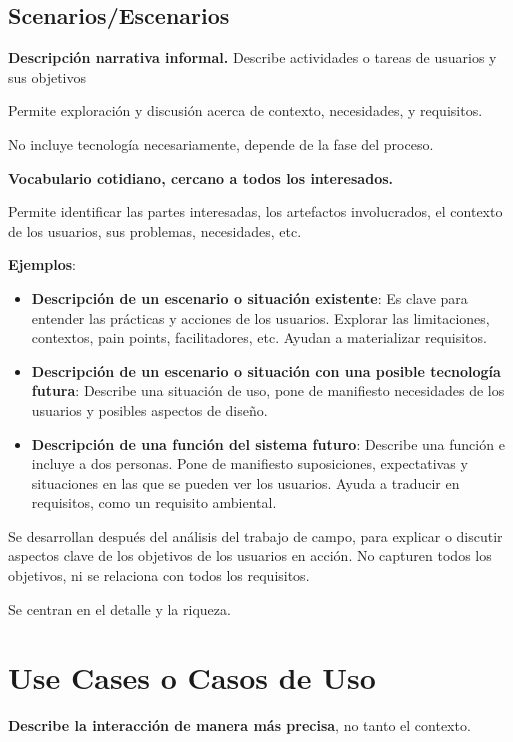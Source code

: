\documentclass[12pt]{report} %
\begin{document}
\subsection{Scenarios/Escenarios}

\textbf{Descripción narrativa informal.} Describe actividades o tareas
de usuarios y sus objetivos

Permite exploración y discusión acerca de contexto, necesidades, y
requisitos.

No incluye tecnología necesariamente, depende de la fase del proceso.

\textbf{Vocabulario cotidiano, cercano a todos los interesados.}

Permite identificar las partes interesadas, los artefactos involucrados,
el contexto de los usuarios, sus problemas, necesidades, etc.

\textbf{Ejemplos}:

\begin{itemize}

\item
  \textbf{Descripción de un escenario o situación existente}: Es clave
  para entender las prácticas y acciones de los usuarios. Explorar las
  limitaciones, contextos, pain points, facilitadores, etc. Ayudan a
  materializar requisitos.
\item
  \textbf{Descripción de un escenario o situación con una posible
  tecnología futura}: Describe una situación de uso, pone de manifiesto
  necesidades de los usuarios y posibles aspectos de diseño.
\item
  \textbf{Descripción de una función del sistema futuro}: Describe una
  función e incluye a dos personas. Pone de manifiesto suposiciones,
  expectativas y situaciones en las que se pueden ver los usuarios.
  Ayuda a traducir en requisitos, como un requisito ambiental.
\end{itemize}

Se desarrollan después del análisis del trabajo de campo, para explicar
o discutir aspectos clave de los objetivos de los usuarios en acción. No
capturen todos los objetivos, ni se relaciona con todos los requisitos.

Se centran en el detalle y la riqueza.

\section{Use Cases o Casos de Uso}

\textbf{Describe la interacción de manera más precisa}, no tanto el
contexto.
\end{document}
